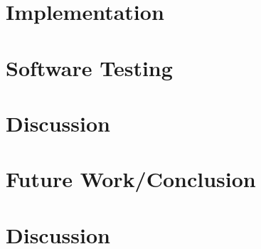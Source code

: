 \documentclass[12pt]{article}
\begin{document}
    \section{Implementation}
    

    \section{Software Testing}
    
    
    \section{Discussion}
    

    \section{Future Work/Conclusion}
    

    \section{Discussion}
    

    \vfill
    \pagebreak


    
\end{document}
